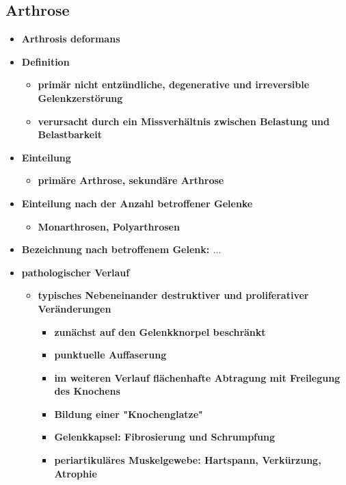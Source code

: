 \subsection{Arthrose}
	\begin{itemize}
		\item \textbf{Arthrosis deformans}
		\item \textbf{Definition}
			\begin{itemize}
				\item \textbf{primär nicht entzündliche, degenerative und irreversible Gelenkzerstörung}
				\item \textbf{verursacht durch ein Missverhältnis zwischen Belastung und Belastbarkeit}
			\end{itemize}
		\item \textbf{Einteilung}
			\begin{itemize}
				\item \textbf{primäre Arthrose, sekundäre Arthrose}
			\end{itemize}
		\item \textbf{Einteilung nach der Anzahl betroffener Gelenke}
			\begin{itemize}
				\item \textbf{Monarthrosen, Polyarthrosen}
			\end{itemize}
		\item \textbf{Bezeichnung nach betroffenem Gelenk: $\dots$}
		\item \textbf{pathologischer Verlauf}
			\begin{itemize}
				\item \textbf{typisches Nebeneinander destruktiver und proliferativer Veränderungen}
					\begin{itemize}
						\item \textbf{zunächst auf den Gelenkknorpel beschränkt}
						\item \textbf{punktuelle Auffaserung}
						\item \textbf{im weiteren Verlauf flächenhafte Abtragung mit Freilegung des Knochens}
						\item \textbf{Bildung einer "Knochenglatze"}
						\item \textbf{Gelenkkapsel: Fibrosierung und Schrumpfung}
						\item \textbf{periartikuläres Muskelgewebe: Hartspann, Verkürzung, Atrophie}
					\end{itemize}
			\end{itemize}


\end{itemize}
